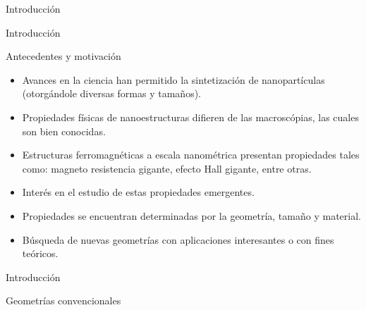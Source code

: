 \begin{frame}
\vfill
\begin{center}
\begin{block}{\begin{center}\begin{Huge}Introducción\end{Huge}\end{center}}
\end{block}
\end{center}
\end{frame}

\begin{frame}{Introducción}
\begin{block}{Antecedentes y motivación}
\begin{itemize}
  \item Avances en la ciencia han permitido la sintetización de nanopartículas (otorgándole diversas formas y tamaños).
  \item Propiedades físicas de nanoestructuras difieren de las macroscópias, las cuales son bien conocidas.
  \item Estructuras ferromagnéticas a escala nanométrica presentan propiedades tales como: magneto resistencia gigante, efecto Hall gigante, entre otras.
  \item Interés en el estudio de estas propiedades emergentes.
  \item Propiedades se encuentran determinadas por la geometría, tamaño y material.
  \item Búsqueda de nuevas geometrías con aplicaciones interesantes o con fines teóricos.
\end{itemize}
\end{block}
\end{frame}

\begin{frame}{Introducción}
\begin{block}{Geometrías convencionales}
\centerline{}
\end{block}
\end{frame}

